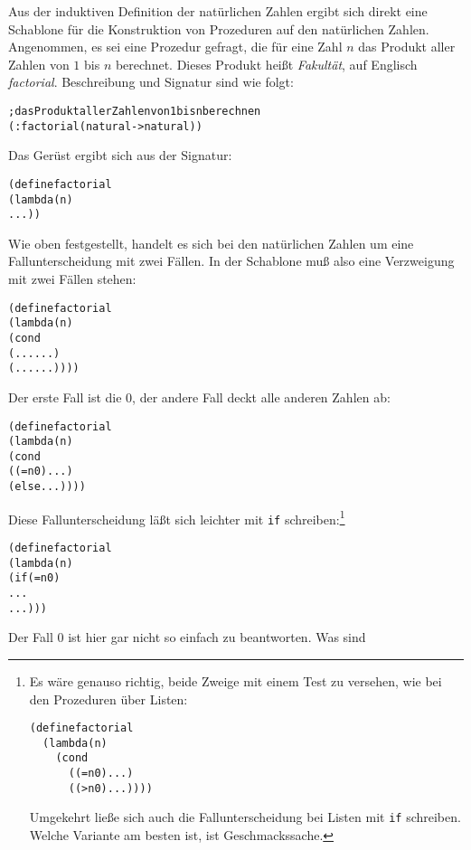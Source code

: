 Aus der induktiven Definition der natürlichen Zahlen ergibt sich direkt eine Schablone für die
Konstruktion von Prozeduren auf den natürlichen Zahlen.  Angenommen,
es sei eine Prozedur gefragt, die für eine Zahl $n$ das Produkt aller
Zahlen von $1$ bis $n$ berechnet. 
Dieses Produkt heißt 
\textit{Fakultät}, auf Englisch
\textit{factorial}. 
  Beschreibung und Signatur sind wie folgt:
%
\begin{alltt}
; das Produkt aller Zahlen von 1 bis n berechnen
(: factorial (natural -> natural))
\end{alltt}
\label{page:factorial}
%
Das Gerüst ergibt sich aus der Signatur:
%
\begin{alltt}
(define factorial
  (lambda (n)
    ...))
\end{alltt}
%
Wie oben festgestellt, handelt es sich bei den natürlichen Zahlen um
eine Fallunterscheidung mit zwei Fällen.  In der Schablone muß also
eine Verzweigung mit zwei Fällen stehen:
%
\begin{alltt}
(define factorial
  (lambda (n)
    (cond
      (... ...)
      (... ...))))
\end{alltt}
%
Der erste Fall ist die $0$, der andere Fall deckt alle anderen Zahlen
ab:
%
\begin{alltt}
(define factorial
  (lambda (n)
    (cond
      ((= n 0) ...)
      (else ...))))
\end{alltt}
%
Diese Fallunterscheidung läßt sich leichter mit \texttt{if}
schreiben:\footnote{Es wäre genauso richtig, beide Zweige
  mit einem Test zu versehen, wie bei den Prozeduren über Listen:
%
\begin{alltt}
(define factorial\\
\hspace*{0em}~~(lambda (n)\\
\hspace*{0em}~~~~(cond\\
\hspace*{0em}~~~~~~((= n 0) ...)\\
\hspace*{0em}~~~~~~((> n 0) ...))))
\end{alltt}
%
Umgekehrt ließe sich auch die Fallunterscheidung bei 
Listen mit \texttt{if} schreiben.  Welche
Variante am besten ist, ist Geschmackssache.}
%
\begin{alltt}
(define factorial
  (lambda (n)
    (if (= n 0)
        ...
        ...)))
\end{alltt}
%
Der Fall $0$ ist hier gar nicht so einfach zu beantworten.  Was sind
